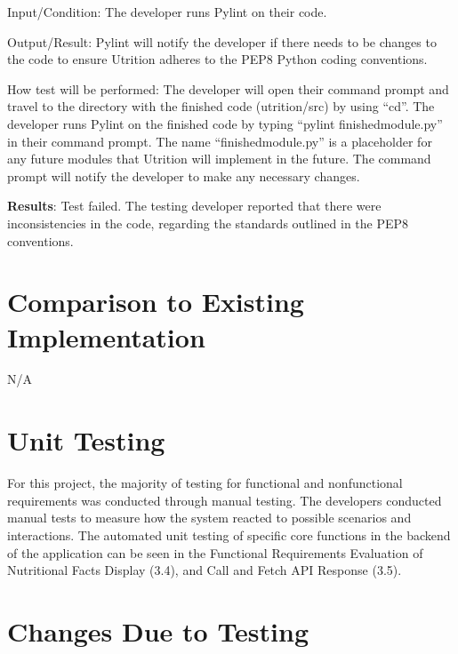 \documentclass[12pt, titlepage]{article}
\begin{document}
\begin{enumerate}
		Input/Condition: The developer runs Pylint on their code.
		
		Output/Result: Pylint will notify the developer if there needs to be changes to the code to ensure Utrition adheres to the PEP8 Python coding conventions.
		
		How test will be performed: The developer will open their command prompt and travel to the directory with the finished code (utrition/src) by using “cd”. The developer runs Pylint on the finished code by typing “pylint finishedmodule.py” in their command prompt. The name “finishedmodule.py” is a placeholder for any future modules that Utrition will implement in the future. The command prompt will notify the developer to make any necessary changes.
		
		\textbf{Results}: Test failed. The testing developer reported that there were inconsistencies in the code, regarding the standards outlined in the PEP8 conventions.
		
		
	\end{enumerate}
	
	\section{Comparison to Existing Implementation}	
	
	N/A
	
	\section{Unit Testing}
	
	For this project, the majority of testing for functional and nonfunctional requirements was conducted through manual testing. The developers conducted manual tests to measure how the system reacted to possible scenarios and interactions. The automated unit testing of specific core functions in the backend of the application can be seen in the Functional Requirements Evaluation of Nutritional Facts Display (3.4), and Call and Fetch API Response (3.5).
	
	\section{Changes Due to Testing}
\end{document}
